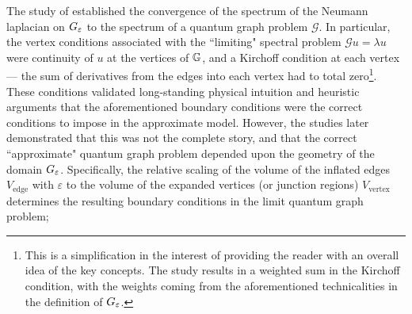 The study of  established the convergence of the spectrum of the Neumann laplacian on $G_{\varepsilon}$ to the spectrum of a quantum graph problem $\mathcal{G}$.
In particular, the vertex conditions associated with the ``limiting" spectral problem $\mathcal{G}u = \lambda u$ were continuity of $u$ at the vertices of $\mathbb{G}$, and a Kirchoff condition at each vertex --- the sum of derivatives from the edges into each vertex had to total zero\footnote{This is a simplification in the interest of providing the reader with an overall idea of the key concepts. The study  results in a weighted sum in the Kirchoff condition, with the weights coming from the aforementioned technicalities in the definition of $G_{\varepsilon}$.}.
These conditions validated long-standing physical intuition and heuristic arguments that the aforementioned boundary conditions were the correct conditions to impose in the approximate model.
However, the studies  later demonstrated that this was not the complete story, and that the correct ``approximate" quantum graph problem depended upon the geometry of the domain $G_{\varepsilon}$.
Specifically, the relative scaling of the volume of the inflated edges $V_{\mathrm{edge}}$ with $\varepsilon$ to the volume of the expanded vertices (or junction regions) $V_{\mathrm{vertex}}$  determines the resulting boundary conditions in the limit quantum graph problem;
